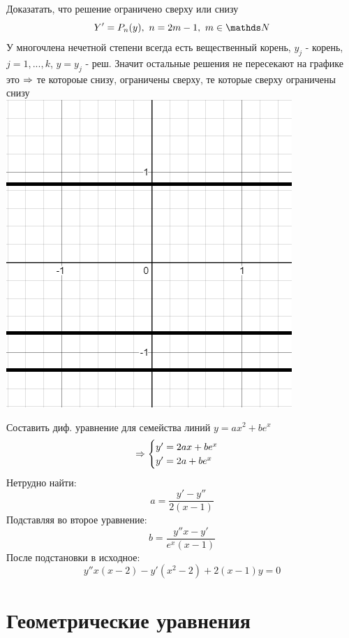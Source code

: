 \documentclass[12pt, fleqn]{article}
\begin{document}
\begin{example}
    Доказатать, что решение ограничено сверху или снизу\\
    \[Y'=P_n(y),\ n=2m-1,\ m \in \N\]
    У многочлена нечетной степени всегда есть вещественный корень, $y_j$ - корень, $j=1,...,k$, $y=y_j$ - реш. Значит остальные решения не пересекают на графике это $\Rightarrow$ те котороые снизу, ограничены сверху, те которые сверху ограничены снизу\\
    \includegraphics[scale=0.3]{pics/resh2.png}
\end{example}

\begin{example}[24, дополнительно]
  Составить диф. уравнение для семейства линий $y=a x^2 + b e^x$
  \[\Rightarrow
  \begin{cases}
    y'=2a x + b e^x\\
    y'=2a + b e^x
  \end{cases}\]
  Нетрудно найти:
  \[a=\frac{y'-y''}{2(x-1)}\]
  Подставляя во второе уравнение:
  \[b=\frac{y'' x - y'}{e^x (x-1)}\]
  После подстановки в исходное:
  \[y'' x(x-2)-y'(x^2-2)+2(x-1)y=0\]
\end{example}

\section{Геометрические уравнения}
\end{document}
